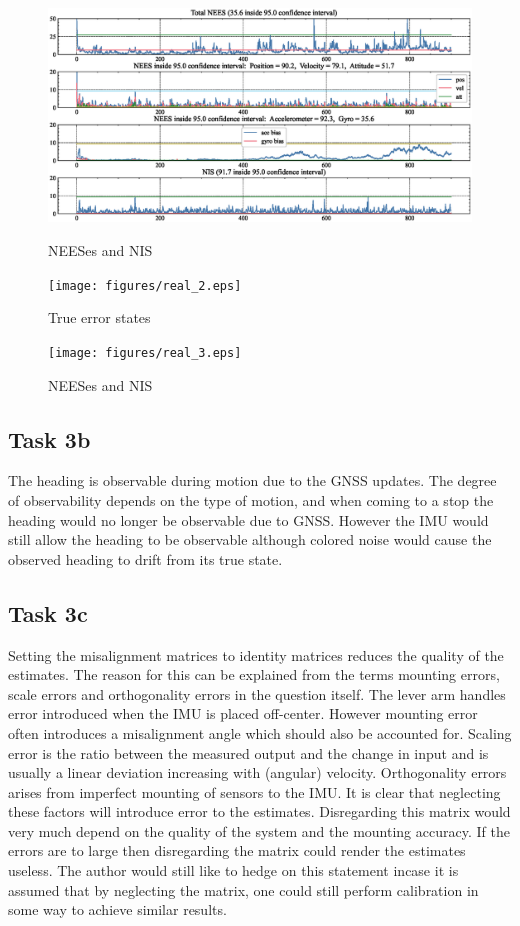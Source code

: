 \begin{figure}
	\centering
	\includegraphics[clip, trim= 0cm 0cm 0cm 0cm, width = \textwidth]{figures/sim_10.eps}
    \caption{NEESes and NIS}
    \label{fig:23states}
    \texttt{[image: figures/real\_2.eps]}
    \caption{True error states}
	\label{fig:23states}
	\texttt{[image: figures/real\_3.eps]}
    \caption{NEESes and NIS}
    \label{fig:23states}
\end{figure}

\subsection*{Task 3b}

The heading is observable during motion due to the GNSS updates. The degree of observability depends
on the type of motion, and when coming to a stop the heading would no longer be observable due to GNSS.
However the IMU would still allow the heading to be observable although colored noise would cause the 
observed heading to drift from its true state.

\subsection*{Task 3c}

Setting the misalignment matrices to identity matrices reduces the quality of the estimates.
The reason for this can be explained from the terms mounting errors, scale errors and 
orthogonality errors in the question itself. The lever arm handles error introduced 
when the IMU is placed off-center. However mounting error often introduces a misalignment angle 
which should also be accounted for. Scaling error is the ratio between the measured 
output and the change in input and is usually a linear deviation increasing with (angular) velocity.
Orthogonality errors arises from imperfect mounting of sensors to the IMU. It is clear that neglecting
these factors will introduce error to the estimates. Disregarding this matrix would very much 
depend on the quality of the system and the mounting accuracy. If the errors are to large then 
disregarding the matrix could render the estimates useless. The author would still like to hedge 
on this statement incase it is assumed that by neglecting the matrix, one could still perform 
calibration in some way to achieve similar results.

